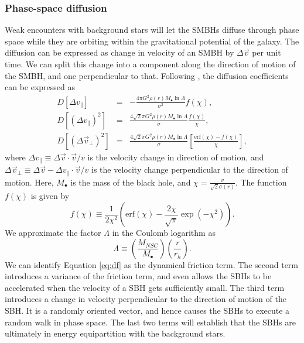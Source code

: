 \documentclass[english, apj]{emulateapj}
\begin{document}
\subsubsection{Phase-space diffusion} \label{psd}
Weak encounters with background stars will let the SMBHs diffuse through phase space while they are orbiting within the gravitational potential of the galaxy. The diffusion can be expressed as change in velocity of an SMBH by $\Delta \vec{v}$ per unit time. We can split this change into a component along the direction of motion of the SMBH, and one perpendicular to that. Following \citet{2008gady.book.....B}, the diffusion coefficients can be expressed as 
\begin{eqnarray}\label{eq:df}
D[\Delta v_\parallel] & = & -\frac{4\pi G^2\rho(r)M_\bullet\ln\Lambda}{\sigma^2}f(\chi),\\
D[(\Delta v_\parallel)^2] & = & \frac{4\sqrt{2}\pi G^2\rho(r)M_\bullet\ln\Lambda}{\sigma}\frac{f(\chi)}{\chi},\\
D[(\Delta \vec{v}_\bot)^2] & = & \frac{4\sqrt{2}\pi G^2\rho(r)M_\bullet\ln\Lambda}{\sigma}\left[\frac{\mbox{erf}(\chi)-f(\chi)}{\chi}\right],
\end{eqnarray} 
where $\Delta v_\parallel \equiv \Delta \vec{v}\cdot\vec{v}/v$ is the velocity change in direction of motion, and $\Delta \vec{v}_\bot \equiv \Delta \vec{v} - \Delta v_\parallel \cdot\vec{v}/v$ is the velocity change perpendicular to the direction of motion. Here, $M_\bullet$ is the mass of the black hole, and $\chi = \frac{v}{\sqrt{2}\sigma(r)}$. The function $f(\chi)$ is given by 
\begin{equation}
f(\chi) \equiv \frac{1}{2\chi^2}\left(\mbox{erf}(\chi)-\frac{2\chi}{\sqrt{\pi}}\exp\left(-\chi^2\right)\right).
\end{equation}
We approximate the factor $\Lambda$ in the Coulomb logarithm as
\begin{equation}
\Lambda \equiv \left(\frac{M_{NSC}}{M_\bullet}\right)\left(\frac{r}{r_h}\right).
\end{equation}
We can identify Equation \ref{eq:df} as the dynamical friction term. The second term introduces a variance of the friction term, and even allows the SBHs to be accelerated when the velocity of a SBH gets sufficiently small. The third term introduces a change in velocity perpendicular to the direction of motion of the SBH. It is a randomly oriented vector, and hence causes the SBHs to execute a random walk in phase space. The last two terms will establish that the SBHs are ultimately in energy equipartition with the background stars.
\end{document}
